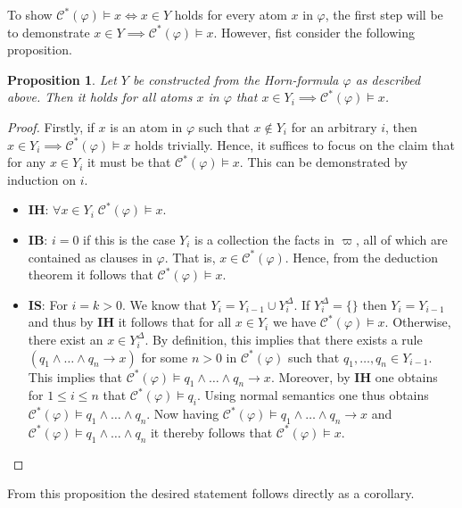 \documentclass [11pt]{article}
\newtheorem{proposition}[theorem]{Proposition}
\newcommand{\lto}{\rightarrow}
\begin{document}
To show  $\mathcal{C}^*(\varphi) \models x  \iff x \in Y$ holds for every atom $x$ in $\varphi$, the first step will be to demonstrate $x \in Y \implies  \mathcal{C}^*(\varphi) \models x $. However, fist consider the following proposition. 
\begin{proposition}
\label{prop:yi-induction}
Let $Y$ be constructed from the Horn-formula $\varphi$ as described above. Then it holds for all atoms $x$ in $\varphi$ that $x \in Y_i \implies \mathcal{C}^*(\varphi) \models x$.
\end{proposition}
\begin{proof}
Firstly, if $x$ is an atom in $\varphi$ such that $x \notin Y_i$ for an arbitrary $i$, then $x \in Y_i \implies \mathcal{C}^*(\varphi) \models x$ holds trivially. Hence, it suffices to focus on the claim that for any $x \in Y_i $ it must be that $\mathcal{C}^*(\varphi) \models x$.
This can be demonstrated by induction on $i$.
\begin{itemize}
\item \textbf{IH}: $\forall x \in Y_i \; \mathcal{C}^*(\varphi) \models x$.
\item \textbf{IB}: $i=0$ if this is the case $Y_i$ is a collection the facts in $\varpi$, all of which are contained as clauses in $\varphi$. That is, $x \in \mathcal{C}^*(\varphi)$. Hence, from the deduction theorem it follows that $\mathcal{C}^*(\varphi) \models x$.
\item \textbf{IS}: For $i=k>0$. We know that $Y_i=Y_{i-1} \cup Y_i^{\Delta}$. If $Y_i^{\Delta}=\{\}$ then $Y_i=Y_{i-1}$ and thus by \textbf{IH} it follows that for all $x \in Y_i $ we have $\mathcal{C}^*(\varphi) \models x$. Otherwise, there exist an $x \in Y_i^{\Delta}$. By definition, this implies that there exists a rule $(q_1 \land \dots \land q_n \lto x)$ for some $n>0$ in $\mathcal{C}^*(\varphi)$ such that $q_1 , \dots , q_n \in Y_{i-1}$. 
This implies that $\mathcal{C}^*(\varphi) \models q_1 \land \dots \land q_n \lto x$. Moreover, by \textbf{IH} one obtains 
for $1 \leq i \leq n$ that $\mathcal{C}^*(\varphi) \models q_i$. Using normal semantics one thus obtains $\mathcal{C}^*(\varphi) \models q_1 \land \dots \land q_n$.  Now having $\mathcal{C}^*(\varphi) \models q_1 \land \dots \land q_n \lto x$ and $\mathcal{C}^*(\varphi) \models q_1 \land \dots \land q_n$ it thereby follows that $\mathcal{C}^*(\varphi) \models x$.
\end{itemize} 
\end{proof}

From this proposition the desired statement follows directly as a corollary. 
\end{document}
